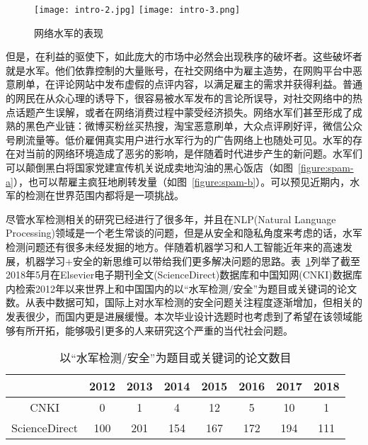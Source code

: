 \begin{figure}[htp]
	\centering
	{\texttt{[image: intro-2.jpg]}}
	\hspace{4em}
	{\texttt{[image: intro-3.png]}}
	\caption[网络水军的表现]{网络水军的表现}
\end{figure}

但是，在利益的驱使下，如此庞大的市场中必然会出现秩序的破坏者。这些破坏者就是水军。他们依靠控制的大量账号，在社交网络中为雇主造势，在网购平台中恶意刷单，在评论网站中发布虚假的点评内容，以满足雇主的需求并获得利益。普通的网民在从众心理的诱导下，很容易被水军发布的言论所误导，对社交网络中的热点话题产生误解，或者在网络消费过程中蒙受经济损失。网络水军们甚至形成了成熟的黑色产业链：微博买粉丝买热搜，淘宝恶意刷单，大众点评刷好评，微信公众号刷流量等。低价雇佣真实用户进行水军行为的广告网络上也随处可见。水军的存在对当前的网络环境造成了恶劣的影响，是伴随着时代进步产生的新问题。水军们可以颠倒黑白将国家党建宣传机关说成卖地沟油的黑心饭店（如图~\ref{figure:spam-a}），也可以帮雇主疯狂地刷转发量（如图~\ref{figure:spam-b}）。可以预见近期内，水军的检测在世界范围内都将是一项挑战。


尽管水军检测相关的研究已经进行了很多年，并且在NLP(Natural Language Processing)领域是一个老生常谈的问题，但是从安全和隐私角度来考虑的话，水军检测问题还有很多未经发掘的地方。伴随着机器学习和人工智能近年来的高速发展，机器学习+安全的新思维可以带给我们更多解决问题的思路。表~\ref{tbl:intro-1}列举了截至2018年5月在Elsevier电子期刊全文(ScienceDirect)数据库和中国知网(CNKI)数据库内检索2012年以来世界上和中国国内的以“水军检测/安全”为题目或关键词的论文数。从表中数据可知，国际上对水军检测的安全问题关注程度逐渐增加，但相关的发表很少，而国内更是进展缓慢。本次毕业设计选题时也考虑到了希望在该领域能够有所开拓，能够吸引更多的人来研究这个严重的当代社会问题。

\begin{table}[htb]
	\centering
	\caption[以“水军检测/安全”为题目或关键词的论文数目]{以“水军检测/安全”为题目或关键词的论文数目}
	\label{tbl:intro-1}
	\begin{tabular}{c|ccccccc}	
		\toprule
						& 2012 & 2013 & 2014 & 2015 & 2016 & 2017 & 2018 \\
		\midrule
		CNKI 			& 0   & 1   & 4   &	12  & 5   & 10  &   1 \\
		ScienceDirect	& 100 & 201 & 154 &	167 & 172 & 194 & 111 \\
		\bottomrule
	\end{tabular}
\end{table}

